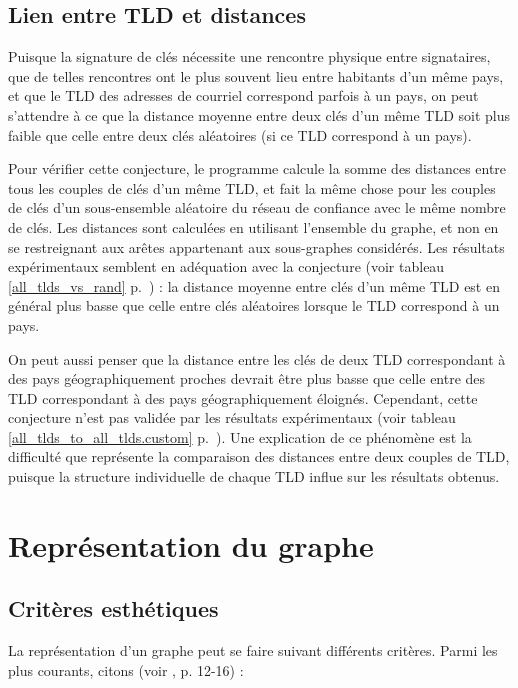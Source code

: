 \documentclass[a4paper]{article}
\begin{document}
\subsection{Lien entre TLD et distances}

Puisque la signature de clés nécessite une rencontre physique entre signataires, que de telles rencontres ont le plus souvent lieu entre habitants d'un même pays, et que le TLD des adresses de courriel correspond parfois à un pays, on peut s'attendre à ce que la distance moyenne entre deux clés d'un même TLD soit plus faible que celle entre deux clés aléatoires (si ce TLD correspond à un pays).

Pour vérifier cette conjecture, le programme calcule la somme des distances entre tous les couples de clés d'un même TLD, et fait la même chose pour les couples de clés d'un sous-ensemble aléatoire du réseau de confiance avec le même nombre de clés. Les distances sont calculées en utilisant l'ensemble du graphe, et non en se restreignant aux arêtes appartenant aux sous-graphes considérés. Les résultats expérimentaux semblent en adéquation avec la conjecture (voir tableau \ref{all_tlds_vs_rand} p.~\pageref{all_tlds_vs_rand}) : la distance moyenne entre clés d'un même TLD est en général plus basse que celle entre clés aléatoires lorsque le TLD correspond à un pays.

On peut aussi penser que la distance entre les clés de deux TLD correspondant à des pays géographiquement proches devrait être plus basse que celle entre des TLD correspondant à des pays géographiquement éloignés. Cependant, cette conjecture n'est pas validée par les résultats expérimentaux (voir tableau \ref{all_tlds_to_all_tlds.custom} p.~\pageref{all_tlds_to_all_tlds.custom}). Une explication de ce phénomène est la difficulté que représente la comparaison des distances entre deux couples de TLD, puisque la structure individuelle de chaque TLD influe sur les résultats obtenus.

\section{Représentation du graphe}

\subsection{Critères esthétiques}

La représentation d'un graphe peut se faire suivant différents critères. Parmi les plus courants, citons (voir \cite{GD}, p. 12-16) :
\end{document}
